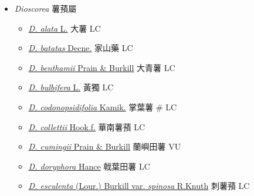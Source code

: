 
  \begin{itemize}
 \item[] \textit{Dioscorea} 薯蕷屬
                                
  \begin{itemize}
        \item[] \href{http://www.theplantlist.org/tpl1.1/search?q=Dioscorea+alata}{\textit{D. alata} L.}   大薯   LC
        \item[] \href{http://www.theplantlist.org/tpl1.1/search?q=Dioscorea+batatas}{\textit{D. batatas} Decne.}   家山藥   LC
        \item[] \href{http://www.theplantlist.org/tpl1.1/search?q=Dioscorea+benthamii}{\textit{D. benthamii} Prain \& Burkill}   大青薯   LC
        \item[] \href{http://www.theplantlist.org/tpl1.1/search?q=Dioscorea+bulbifera}{\textit{D. bulbifera} L.}   黃獨   LC
        \item[] \href{http://www.theplantlist.org/tpl1.1/search?q=Dioscorea+codonopsidifolia}{\textit{D. codonopsidifolia} Kamik.}   掌葉薯  \# LC
        \item[] \href{http://www.theplantlist.org/tpl1.1/search?q=Dioscorea+collettii}{\textit{D. collettii} Hook.f.}   華南薯蕷   LC
        \item[] \href{http://www.theplantlist.org/tpl1.1/search?q=Dioscorea+cumingii}{\textit{D. cumingii} Prain \& Burkill}   蘭嶼田薯   VU
        \item[] \href{http://www.theplantlist.org/tpl1.1/search?q=Dioscorea+doryphora}{\textit{D. doryphora} Hance}   戟葉田薯   LC
        \item[] \href{http://www.theplantlist.org/tpl1.1/search?q=Dioscorea+esculenta+var.+spinosa}{\textit{D. esculenta} (Lour.) Burkill var. \textit{spinosa} R.Knuth}   刺薯蕷   LC

\end{itemize}
\end{itemize}

